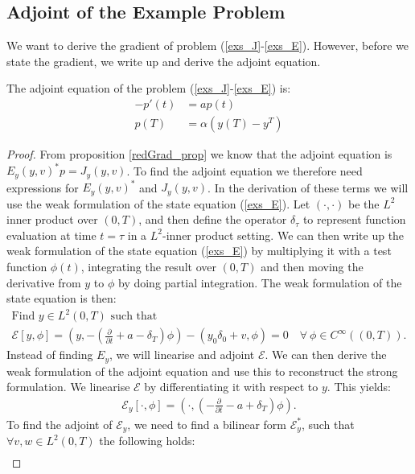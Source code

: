 \subsection{Adjoint of the Example Problem}
We want to derive the gradient of problem (\ref{exs_J}-\ref{exs_E}). However, before we state the gradient, we write up and derive the adjoint equation.
\begin{proposition} \label{adjoint_eq_prop}
The adjoint equation of the problem (\ref{exs_J}-\ref{exs_E}) is:
\begin{align}     
-p'(t) &= ap(t) \label{exs_adjoint_eq}\\
p(T) &= \alpha(y(T)-y^T)   \label{exs_adjoint_ic}  
\end{align}
\end{proposition}
\begin{proof}
From proposition \ref{redGrad_prop} we know that the adjoint equation is $E_y(y,v)^{*}p=J_y(y,v)$. To find the adjoint equation we therefore need expressions for $E_y(y,v)^{*}$ and $J_y(y,v)$. In the derivation of these terms we will use the weak formulation of the state equation (\ref{exs_E}). Let $(\cdot,\cdot)$ be the $L^2$ inner product over $(0,T)$, and then define the operator $\delta_{\tau}$ to represent function evaluation at time $t=\tau$ in a $L^2$-inner product setting. We can then write up the weak formulation of the state equation (\ref{exs_E}) by multiplying it with a test function $\phi(t)$, integrating the result over $(0,T)$ and then moving the derivative from $y$ to $\phi$ by doing partial integration. The weak formulation of the state equation is then:
\begin{gather*}
\textrm{Find $y \in L^2(0,T)$ such that}\\
\mathcal{E}[y,\phi]= (y,-(\frac{\partial}{\partial t}+a- \delta_T)\phi) -(y_0\delta_0+v,\phi)=0\quad	 \forall \ \phi \in C^{\infty}((0,T)).
\end{gather*}
Instead of finding $E_y$, we will linearise and adjoint $\mathcal{E}$. We can then derive the weak formulation of the adjoint equation and use this to reconstruct the strong formulation. We linearise $\mathcal{E}$ by differentiating it with respect to $y$. This yields:
\begin{align*}
\mathcal{E}_y[\cdot,\phi]=(\cdot,(-\frac{\partial}{\partial t} - a + \delta_T)\phi).
\end{align*}
To find the adjoint of $\mathcal{E}_y$, we need to find a bilinear form $\mathcal{E}_y^*$, such that $\forall v,w\in L^2(0,T)$ the following holds:
\begin{align*}

\end{align*}
\end{proof}
